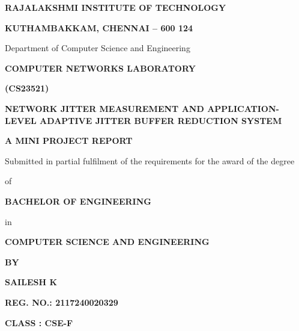 \documentclass[12pt, a4paper]{report}
\begin{document}
\begin{titlepage}
    \thispagestyle{empty}
    \centering
    \vspace*{0.5cm}
    
    {\Large\bfseries RAJALAKSHMI INSTITUTE OF TECHNOLOGY\par}
    \vspace{0.2cm}
    {\large\bfseries KUTHAMBAKKAM, CHENNAI -- 600 124\par}
    \vspace{0.2cm}
    {\large Department of Computer Science and Engineering\par}
    
    \vspace{1.5cm}
    
    {\Large\bfseries COMPUTER NETWORKS LABORATORY\par}
    \vspace{0.2cm}
    {\large\bfseries (CS23521)\par}
    
    \vspace{1.2cm}
    
    {\LARGE\bfseries NETWORK JITTER MEASUREMENT AND APPLICATION-LEVEL ADAPTIVE JITTER BUFFER REDUCTION SYSTEM\par}
    
    \vspace{1.2cm}
    
    {\large\bfseries A MINI PROJECT REPORT\par}
    \vspace{0.3cm}
    {\normalsize Submitted in partial fulfilment of the requirements for the award of the degree\par of\par}
    \vspace{0.3cm}
    {\Large\bfseries BACHELOR OF ENGINEERING\par}
    {\large in\par}
    {\large\bfseries COMPUTER SCIENCE AND ENGINEERING\par}
    
    \vspace{1.5cm}
    
    {\large\bfseries BY\par}
    \vspace{0.4cm}
    {\textbf{\Large SAILESH K}\par}
    \vspace{0.2cm}
    {\textbf{\large REG. NO.: 2117240020329}\par}
    \vspace{0.2cm}
    {\textbf{\large CLASS : CSE-F}\par}
    

\end{titlepage}
\end{document}
